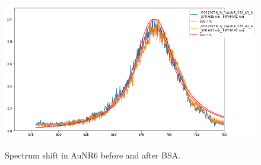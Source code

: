 \documentclass[twoside,single]{lion-msc}
\begin{document}
\begin{figure}[h]
\includegraphics[width=.8\textwidth,center]{7}
\begin{center}
Spectrum shift in AuNR6 before and after BSA.
\end{center}
\end{figure}
\end{document}
